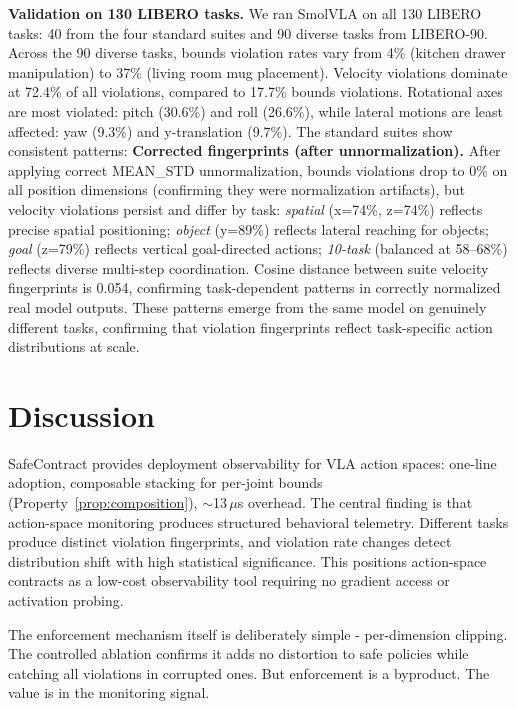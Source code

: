 \documentclass[conference]{IEEEtran}
\begin{document}
\textbf{Validation on 130 LIBERO tasks.}
We ran SmolVLA on all 130 LIBERO tasks: 40 from the four standard suites and 90 diverse tasks from LIBERO-90.
Across the 90 diverse tasks, bounds violation rates vary from 4\% (kitchen drawer manipulation) to 37\% (living room mug placement).
Velocity violations dominate at 72.4\% of all violations, compared to 17.7\% bounds violations.
Rotational axes are most violated: pitch (30.6\%) and roll (26.6\%), while lateral motions are least affected: yaw (9.3\%) and y-translation (9.7\%).
The standard suites show consistent patterns:
\textbf{Corrected fingerprints (after unnormalization).}
After applying correct MEAN\_STD unnormalization, bounds violations drop to 0\% on all position dimensions (confirming they were normalization artifacts), but velocity violations persist and differ by task:
\emph{spatial} (x=74\%, z=74\%) reflects precise spatial positioning;
\emph{object} (y=89\%) reflects lateral reaching for objects;
\emph{goal} (z=79\%) reflects vertical goal-directed actions;
\emph{10-task} (balanced at 58--68\%) reflects diverse multi-step coordination.
Cosine distance between suite velocity fingerprints is 0.054, confirming task-dependent patterns in correctly normalized real model outputs.
These patterns emerge from the same model on genuinely different tasks, confirming that violation fingerprints reflect task-specific action distributions at scale.


\section{Discussion}

SafeContract provides deployment observability for VLA action spaces: one-line adoption, composable stacking for per-joint bounds (Property~\ref{prop:composition}), ${\sim}$13\,$\mu$s overhead.
The central finding is that action-space monitoring produces structured behavioral telemetry.
Different tasks produce distinct violation fingerprints, and violation rate changes detect distribution shift with high statistical significance.
This positions action-space contracts as a low-cost observability tool requiring no gradient access or activation probing.

The enforcement mechanism itself is deliberately simple - per-dimension clipping.
The controlled ablation confirms it adds no distortion to safe policies while catching all violations in corrupted ones.
But enforcement is a byproduct. The value is in the monitoring signal.
\end{document}
